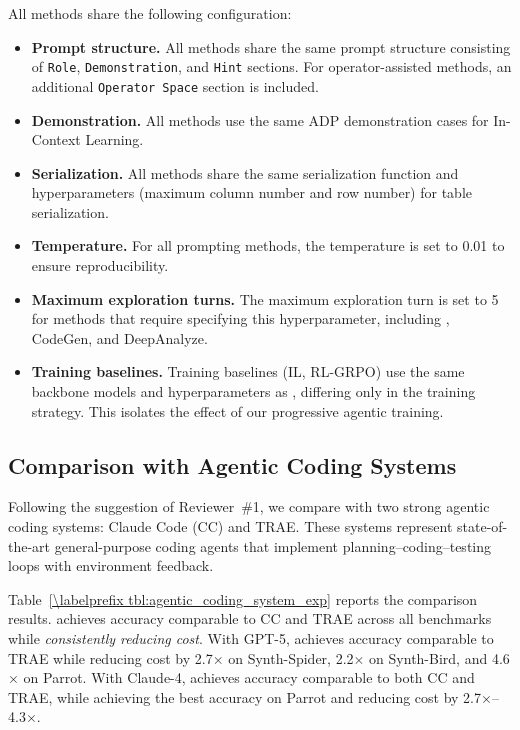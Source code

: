 All methods share the following configuration:
\begin{itemize}[leftmargin=*]
    \item \textbf{Prompt structure.} All methods share the same prompt structure consisting of \texttt{Role}, \texttt{Demonstration}, and \texttt{Hint} sections. For operator-assisted methods, an additional \texttt{Operator Space} section is included.
    \item \textbf{Demonstration.} All methods use the same ADP demonstration cases for In-Context Learning.
    \item \textbf{Serialization.} All methods share the same serialization function and hyperparameters (maximum column number and row number) for table serialization.
    \item \textbf{Temperature.} For all prompting methods, the temperature is set to 0.01 to ensure reproducibility.
    \item \textbf{Maximum exploration turns.} The maximum exploration turn is set to 5 for methods that require specifying this hyperparameter, including \sys, CodeGen, and DeepAnalyze.
    \item \textbf{Training baselines.} Training baselines (IL, RL-GRPO) use the same backbone models and hyperparameters as \sys, differing only in the training strategy. This isolates the effect of our progressive agentic training.
\end{itemize}

\subsection{Comparison with Agentic Coding Systems}
\label{subsec:appendix_agentic_coding}

Following the suggestion of Reviewer~\#1, we compare \sys with two strong agentic coding systems: Claude Code (CC) and TRAE. These systems represent state-of-the-art general-purpose coding agents that implement planning--coding--testing loops with environment feedback.



Table~\ref{\labelprefix tbl:agentic_coding_system_exp} reports the comparison results. \sys achieves accuracy comparable to CC and TRAE across all benchmarks while \emph{consistently reducing cost}. With GPT-5, \sys achieves accuracy comparable to TRAE while reducing cost by 2.7$\times$ on Synth-Spider, 2.2$\times$ on Synth-Bird, and 4.6$\times$ on Parrot. With Claude-4, \sys achieves accuracy comparable to both CC and TRAE, while achieving the best accuracy on Parrot and reducing cost by 2.7$\times$--4.3$\times$.


